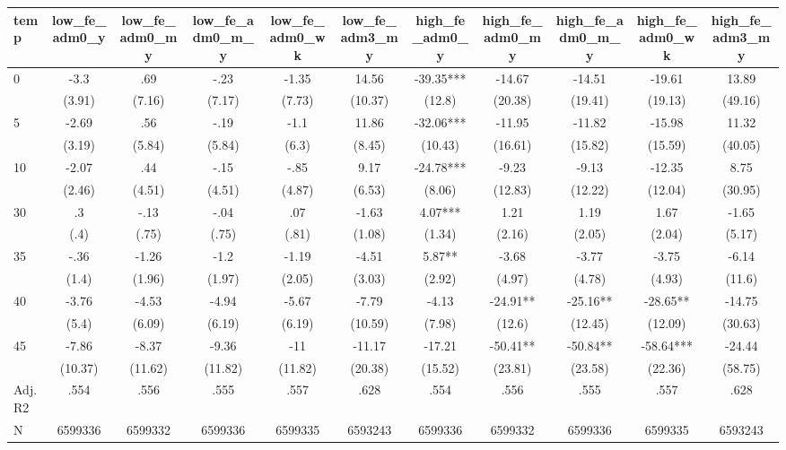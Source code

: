 \documentclass[]{article}
\begin{document}
\begin{tabular}{lcccccccccc} \hline
temp & low\_fe\_adm0\_y & low\_fe\_adm0\_my & low\_fe\_adm0\_m\_y & low\_fe\_adm0\_wk & low\_fe\_adm3\_my & high\_fe\_adm0\_y & high\_fe\_adm0\_my & high\_fe\_adm0\_m\_y & high\_fe\_adm0\_wk & high\_fe\_adm3\_my \\ \hline
0 & -3.3 & .69 & -.23 & -1.35 & 14.56 & -39.35*** & -14.67 & -14.51 & -19.61 & 13.89 \\
 & (3.91) & (7.16) & (7.17) & (7.73) & (10.37) & (12.8) & (20.38) & (19.41) & (19.13) & (49.16) \\
5 & -2.69 & .56 & -.19 & -1.1 & 11.86 & -32.06*** & -11.95 & -11.82 & -15.98 & 11.32 \\
 & (3.19) & (5.84) & (5.84) & (6.3) & (8.45) & (10.43) & (16.61) & (15.82) & (15.59) & (40.05) \\
10 & -2.07 & .44 & -.15 & -.85 & 9.17 & -24.78*** & -9.23 & -9.13 & -12.35 & 8.75 \\
 & (2.46) & (4.51) & (4.51) & (4.87) & (6.53) & (8.06) & (12.83) & (12.22) & (12.04) & (30.95) \\
30 & .3 & -.13 & -.04 & .07 & -1.63 & 4.07*** & 1.21 & 1.19 & 1.67 & -1.65 \\
 & (.4) & (.75) & (.75) & (.81) & (1.08) & (1.34) & (2.16) & (2.05) & (2.04) & (5.17) \\
35 & -.36 & -1.26 & -1.2 & -1.19 & -4.51 & 5.87** & -3.68 & -3.77 & -3.75 & -6.14 \\
 & (1.4) & (1.96) & (1.97) & (2.05) & (3.03) & (2.92) & (4.97) & (4.78) & (4.93) & (11.6) \\
40 & -3.76 & -4.53 & -4.94 & -5.67 & -7.79 & -4.13 & -24.91** & -25.16** & -28.65** & -14.75 \\
 & (5.4) & (6.09) & (6.19) & (6.19) & (10.59) & (7.98) & (12.6) & (12.45) & (12.09) & (30.63) \\
45 & -7.86 & -8.37 & -9.36 & -11 & -11.17 & -17.21 & -50.41** & -50.84** & -58.64*** & -24.44 \\
 & (10.37) & (11.62) & (11.82) & (11.82) & (20.38) & (15.52) & (23.81) & (23.58) & (22.36) & (58.75) \\
\hline Adj. R2 & .554 & .556 & .555 & .557 & .628 & .554 & .556 & .555 & .557 & .628 \\
 N & 6599336 & 6599332 & 6599336 & 6599335 & 6593243 & 6599336 & 6599332 & 6599336 & 6599335 & 6593243 \\ \hline
\end{tabular}
\end{document}

